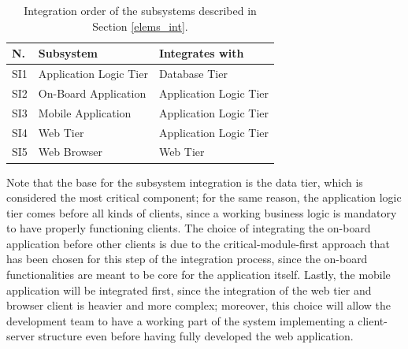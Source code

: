 \begin{table}[H]
\begin{center}
\begin{tabular}{p{} | p{} | p{}}
\hline
\textbf{N.} & \textbf{Subsystem} & \textbf{Integrates with} \\
\hline
SI1 & Application Logic Tier & Database Tier \\
\hline
SI2 & On-Board Application & Application Logic Tier \\
\hline
SI3 & Mobile Application & Application Logic Tier \\
\hline
SI4 & Web Tier & Application Logic Tier \\
\hline
SI5 & Web Browser & Web Tier \\
\hline
\end{tabular}
\end{center}
\caption{Integration order of the subsystems described in Section \ref{elems_int}.}
\label{subsys_int}
\end{table}

Note that the base for the subsystem integration is the data tier, which is considered the most critical component; for the same reason, the application logic tier comes before all kinds of clients, since a working business logic is mandatory to have properly functioning clients. The choice of integrating the on-board application before other clients is due to the critical-module-first approach that has been chosen for this step of the integration process, since the on-board functionalities are meant to be core for the application itself. Lastly, the mobile application will be integrated first, since the integration of the web tier and browser client is heavier and more complex; moreover, this choice will allow the development team to have a working part of the system implementing a client-server structure even before having fully developed the web application.